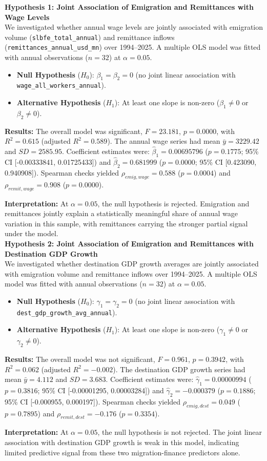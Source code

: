 \indent \textbf{Hypothesis 1: Joint Association of Emigration and Remittances with Wage Levels}\\
We investigated whether annual wage levels are jointly associated with emigration volume (\texttt{slbfe\_total\_annual}) and remittance inflows (\texttt{remittances\_annual\_usd\_mn}) over 1994--2025. A multiple OLS model was fitted with annual observations ($n = 32$) at $\alpha = 0.05$.
\begin{itemize}[noitemsep, topsep=0pt]
    \item \textbf{Null Hypothesis} ($H_0$): $\beta_1 = \beta_2 = 0$ (no joint linear association with \texttt{wage\_all\_workers\_annual}).
    \item \textbf{Alternative Hypothesis} ($H_1$): At least one slope is non-zero ($\beta_1 \neq 0$ or $\beta_2 \neq 0$).
\end{itemize}
\noindent \textbf{Results:} The overall model was significant, $F = 23.181$, $p = 0.0000$, with $R^2 = 0.615$ (adjusted $R^2 = 0.589$). The annual wage series had mean $\bar{y} = 3229.42$ and $SD = 2585.95$. Coefficient estimates were: $\hat\beta_1 = 0.00695796$ ($p = 0.1775$; 95\% CI [-0.00333841, 0.01725433]) and $\hat\beta_2 = 0.681999$ ($p = 0.0000$; 95\% CI [0.423090, 0.940908]). Spearman checks yielded $\rho_{emig,wage} = 0.588$ ($p = 0.0004$) and $\rho_{remit,wage} = 0.908$ ($p = 0.0000$).

\noindent \textbf{Interpretation:} At $\alpha = 0.05$, the null hypothesis is rejected. Emigration and remittances jointly explain a statistically meaningful share of annual wage variation in this sample, with remittances carrying the stronger partial signal under the model.
~\\

\indent \textbf{Hypothesis 2: Joint Association of Emigration and Remittances with Destination GDP Growth}\\
We investigated whether destination GDP growth averages are jointly associated with emigration volume and remittance inflows over 1994--2025. A multiple OLS model was fitted with annual observations ($n = 32$) at $\alpha = 0.05$.
\begin{itemize}[noitemsep, topsep=0pt]
    \item \textbf{Null Hypothesis} ($H_0$): $\gamma_1 = \gamma_2 = 0$ (no joint linear association with \texttt{dest\_gdp\_growth\_avg\_annual}).
    \item \textbf{Alternative Hypothesis} ($H_1$): At least one slope is non-zero ($\gamma_1 \neq 0$ or $\gamma_2 \neq 0$).
\end{itemize}
\noindent \textbf{Results:} The overall model was not significant, $F = 0.961$, $p = 0.3942$, with $R^2 = 0.062$ (adjusted $R^2 = -0.002$). The destination GDP growth series had mean $\bar{y} = 4.112$ and $SD = 3.683$. Coefficient estimates were: $\hat\gamma_1 = 0.00000994$ ($p = 0.3816$; 95\% CI [-0.00001295, 0.00003284]) and $\hat\gamma_2 = -0.000379$ ($p = 0.1886$; 95\% CI [-0.000955, 0.000197]). Spearman checks yielded $\rho_{emig,dest} = 0.049$ ($p = 0.7895$) and $\rho_{remit,dest} = -0.176$ ($p = 0.3354$).

\noindent \textbf{Interpretation:} At $\alpha = 0.05$, the null hypothesis is not rejected. The joint linear association with destination GDP growth is weak in this model, indicating limited predictive signal from these two migration-finance predictors alone.
~\\
